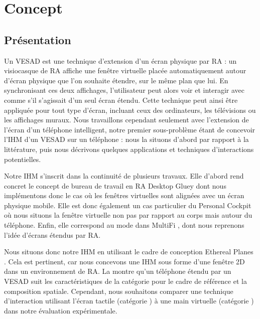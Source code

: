 \chapter{Concept}
\label{ch:concept}

\section{Présentation}
\label{sec:concept_introduction}

Un VESAD est une technique d'extension d'un écran physique par RA : un visiocasque de RA affiche une fenêtre virtuelle placée automatiquement autour d'écran physique que l'on souhaite étendre, sur le même plan que lui. En synchronisant ces deux affichages, l'utilisateur peut alors voir et interagir avec comme s'il s'agissait d'un seul écran étendu. Cette technique peut ainsi être appliquée pour tout type d'écran, incluant ceux des ordinateurs, les télévisions ou les affichages muraux. Nous travaillons cependant seulement avec l'extension de l'écran d'un téléphone intelligent, notre premier sous-problème étant de concevoir l'IHM d'un VESAD sur un téléphone : nous la situons d'abord par rapport à la littérature, puis nous décrivons quelques applications et techniques d'interactions potentielles.

Notre IHM s'inscrit dans la continuité de plusieurs travaux. Elle d'abord rend concret le concept de bureau de travail en RA Desktop Gluey \citep{Serrano2015a} dont nous implémentons donc le cas où les fenêtres virtuelles sont alignées avec un écran physique mobile. Elle est donc également un cas particulier du Personal Cockpit \citep{Ens2014} où nous situons la fenêtre virtuelle non pas par rapport au corps mais autour du téléphone. Enfin, elle correspond au mode  dans MultiFi \citep{Grubert2015}, dont nous reprenons l'idée d'écrans étendus par RA.

Nous situons donc notre IHM en utilisant le cadre de conception Ethereal Planes \citep{Ens2014a}. Cela est pertinent, car nous concevons une IHM sous forme d'une fenêtre 2D dans un environnement de RA. La  montre qu'un téléphone étendu par un VESAD suit les caractéristiques de la catégorie  pour le cadre de référence et la composition spatiale. Cependant, nous souhaitons comparer une technique d'interaction utilisant l'écran tactile (catégorie ) à une main virtuelle (catégorie ) dans notre évaluation expérimentale.

